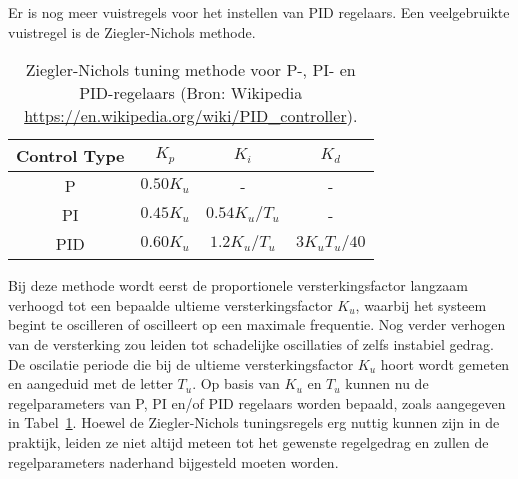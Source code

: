 \documentclass[a4paper,11pt]{article}
\begin{document}
Er is nog meer vuistregels voor het instellen van PID regelaars. Een
veelgebruikte vuistregel is de Ziegler-Nichols methode.
\begin{table}
  \centering
  \caption{Ziegler-Nichols tuning methode voor P-, PI- en PID-regelaars (Bron: Wikipedia
  \url{https://en.wikipedia.org/wiki/PID_controller}).}
  \label{tab:ziegler}
  \begin{tabular}{c|ccc}
    \hline\hline
    Control Type & $K_p$ & $K_i$ & $K_d$\\
    \hline
    P & $0.50 K_u$ & - & - \\
    PI & $0.45K_u$ & $0.54K_u/T_u$ & - \\
    PID & $0.60K_u$ & $1.2K_u/T_u$ & $3K_uT_u/40$\\
    \hline\hline
  \end{tabular}
\end{table}
Bij deze methode wordt eerst de proportionele versterkingsfactor langzaam
verhoogd tot een bepaalde ultieme versterkingsfactor $K_u$, waarbij het
systeem begint te oscilleren of oscilleert op een maximale frequentie. Nog verder
verhogen van de versterking zou leiden tot schadelijke oscillaties of zelfs
instabiel gedrag. De oscilatie periode die bij de ultieme versterkingsfactor
$K_u$ hoort wordt gemeten en aangeduid met de letter $T_u$. 
Op basis van $K_u$ en $T_u$ kunnen nu de regelparameters van P, PI en/of PID
regelaars worden bepaald, zoals aangegeven in Tabel~\ref{tab:ziegler}.
Hoewel de Ziegler-Nichols tuningsregels erg nuttig kunnen zijn in de praktijk,
leiden ze niet altijd meteen tot het gewenste regelgedrag en zullen de
regelparameters naderhand bijgesteld moeten worden.
\end{document}
